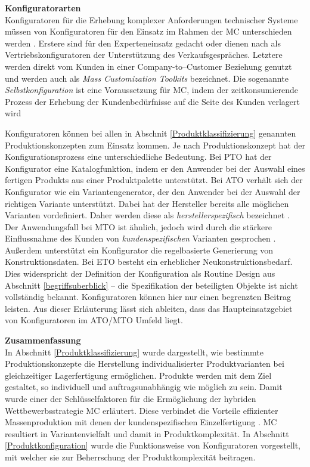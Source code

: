 \documentclass[11pt, a4paper, titlepage, listof=totoc, bibliography=totoc, index=totoc, twoside, openright, headings=normal]{scrreprt}
\begin{document}
\textbf{Konfiguratorarten}\\
Konfiguratoren für die Erhebung komplexer Anforderungen technischer Systeme  müssen von Konfiguratoren für den Einsatz im Rahmen der \ac{MC} unterschieden werden \citep{felferning14}. Erstere sind für den Experteneinsatz gedacht oder dienen nach \citet{piller06} als Vertriebskonfiguratoren der Unterstützung des Verkaufsgespräches. Letztere werden direkt vom Kunden in einer Company-to–Customer Beziehung genutzt und werden auch als \emph{Mass Customization Toolkits} bezeichnet. Die sogenannte \emph{Selbstkonfiguration} ist eine Voraussetzung für \ac{MC}, indem der zeitkonsumierende Prozess der Erhebung der Kundenbedürfnisse auf die Seite des Kunden verlagert wird \citep{piller06}

Konfiguratoren können bei allen in Abschnit \ref{Produktklassifizierung} genannten Produktionskonzepten zum Einsatz kommen. Je nach Produktionskonzept hat der Konfigurationsprozess eine unterschiedliche Bedeutung. Bei \ac{PTO} hat der Konfigurator eine Katalogfunktion, indem er den Anwender bei der Auswahl eines fertigen Produkts aus einer Produktpalette unterstützt. Bei \ac{ATO} verhält sich der Konfigurator wie ein Variantengenerator, der den Anwender bei der Auswahl der richtigen Variante unterstützt. Dabei hat der Hersteller bereits alle möglichen Varianten vordefiniert. Daher werden diese als \emph{herstellerspezifisch} bezeichnet \citep{schomburg80}. Der Anwendungsfall bei \ac{MTO} ist ähnlich, jedoch wird durch die stärkere Einflussnahme des Kunden von \emph{kundenspezifischen} Varianten gesprochen \citep{schomburg80}. Außerdem unterstützt ein Konfigurator die regelbasierte Generierung von Konstruktionsdaten. Bei \ac{ETO} besteht ein erheblicher Neukonstruktionsbedarf. Dies widerspricht der Definition der Konfiguration als Routine Design aus Abschnitt \ref{begriffsuberblick} -- die Spezifikation der beteiligten Objekte ist nicht vollständig bekannt. Konfiguratoren können hier nur einen begrenzten Beitrag leisten. Aus dieser Erläuterung lässt sich ableiten, dass das Haupteinsatzgebiet von Konfiguratoren im \ac{ATO}/\ac{MTO} Umfeld liegt.

\textbf{Zusammenfassung}\\
In Abschnitt \ref{Produktklassifizierung} wurde dargestellt, wie bestimmte Produktionskonzepte die Herstellung individualisierter Produktvarianten bei gleichzeitiger Lagerfertigung ermöglichen. Produkte werden mit dem Ziel gestaltet, so individuell und auftragsunabhängig wie möglich zu sein. Damit wurde einer der Schlüsselfaktoren für die Ermöglichung der hybriden Wettbewerbsstrategie \ac{MC} erläutert. Diese verbindet die Vorteile effizienter Massenproduktion mit denen
der kundenspezifischen Einzelfertigung \citep{piller98}. \ac{MC} resultiert in Variantenvielfalt und damit in Produktkomplexität. In Abschnitt \ref{Produktkonfiguration} wurde die Funktionsweise von Konfiguratoren vorgestellt, mit welcher sie zur Beherrschung der Produktkomplexität beitragen.
\end{document}
